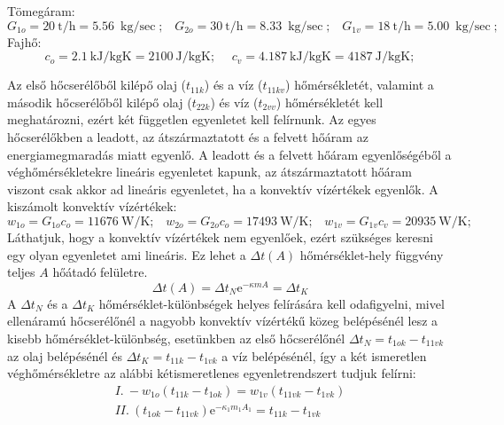 \flushleft Tömegáram: \newline 
\begin{equation*}
		G_{1o}= \SI{20}{\tonne\per\hour} = \SI{5.56}{\kilogram\per\sec}; \hspace{10pt} 
		G_{2o}= \SI{30}{\tonne\per\hour} = \SI{8.33}{\kilogram\per\sec}; \hspace{10pt}
		G_{1v}= \SI{18}{\tonne\per\hour} = \SI{5.00}{\kilogram\per\sec};
\end{equation*}
\flushleft Fajhő: \newline
\begin{equation*}
		c_o= \SI{2,1}{\kilo\joule\per\kilogram\kelvin} = \SI{2100}{\joule\per\kilogram\kelvin}; \hspace{15pt}
		c_v= \SI{4,187}{\kilo\joule\per\kilogram\kelvin} = \SI{4187}{\joule\per\kilogram\kelvin};
\end{equation*}
\vspace{5pt}



Az első hőcserélőből kilépő olaj ($t_{11k}$) és a víz ($t_{11kv}$) hőmérsékletét, valamint a második hőcserélőből kilépő olaj ($t_{22k}$) és víz ($t_{2vv}$) hőmérsékletét kell meghatározni, ezért két független egyenletet kell felírnunk. Az egyes hőcserélőkben a leadott, az átszármaztatott és a felvett hőáram az energiamegmaradás miatt egyenlő. A leadott és a felvett hőáram egyenlőségéből a véghőmérsékletekre lineáris egyenletet kapunk, az átszármaztatott hőáram viszont csak akkor ad lineáris egyenletet, ha a konvektív vízértékek egyenlők. A kiszámolt konvektív vízértékek:
\begin{equation*}
		w_{1o} = G_{1o} c_o = \SI{11676}{\watt\per\kelvin}; \hspace{10pt} 
		w_{2o} = G_{2o} c_o = \SI{17493}{\watt\per\kelvin}; \hspace{10pt}
		w_{1v} = G_{1v} c_v = \SI{20935}{\watt\per\kelvin};
\end{equation*}
Láthatjuk, hogy a konvektív vízértékek nem egyenlőek, ezért szükséges keresni egy olyan egyenletet ami lineáris. Ez lehet a $\Delta t(A)$ hőmérséklet-hely függvény teljes $A$ hőátadó felületre.
\begin{equation}
	\Delta t(A) = \Delta t_N \mathrm{e}^{-\kappa m A} = \Delta t_K
\end{equation}
A $\Delta t_N$ és a $\Delta t_K$ hőmérséklet-különbségek helyes felírására kell odafigyelni, mivel ellenáramú hőcserélőnél a nagyobb konvektív vízértékű közeg belépésénél lesz a kisebb hőmérséklet-különbség, esetünkben az első hőcserélőnél $\Delta t_N = t_{1ok}-t_{11vk}$ az olaj belépésénél és $\Delta t_K = t_{11k}-t_{1vk}$ a víz belépésénél, így a két ismeretlen véghőmérsékletre az alábbi kétismeretlenes egyenletrendszert tudjuk felírni:
\begin{gather*}
	I.\: -w_{1o} (t_{11k} - t_{1ok}) = w_{1v} (t_{11vk} - t_{1vk}) \\
	II.\: (t_{1ok} - t_{11vk})\mathrm{e}^{-\kappa_1 m_1 A_1} = t_{11k} - t_{1vk}
\end{gather*}


